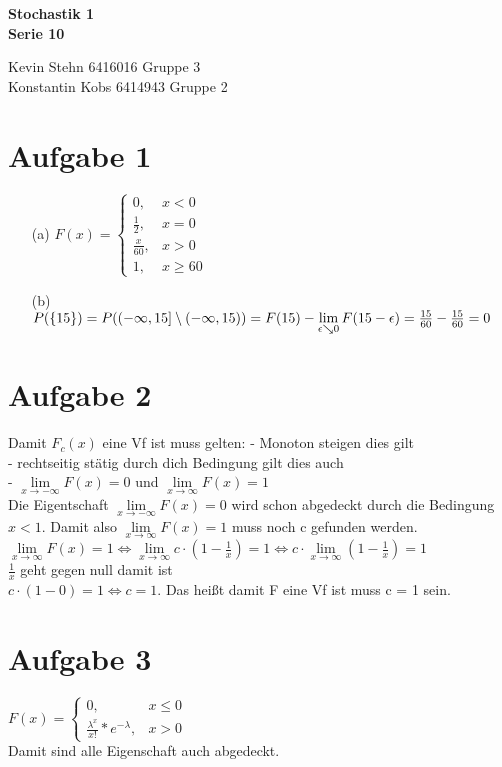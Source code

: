 \documentclass[10pt,a4paper]{article}
\begin{document}
\begin{center}
\textbf{Stochastik 1 \\ Serie 10 \\}
\end{center}

\begin{flushright}
Kevin Stehn 6416016 Gruppe 3 \\
Konstantin Kobs 6414943 Gruppe 2
\end{flushright}

\section*{Aufgabe 1}
\begin{itemize}
\item[(a)]
$ F(x)=\left\{\begin{array}{cl} 0, & x < 0\\ 
\frac{1}{2}, & x = 0 \\ 
\frac{x}{60}, & x > 0 \\
1 , & x \geq 60 \end{array}\right.$
\item[(b)]$P(\{15\}) = P((-\infty,15] \setminus (-\infty,15)) \\
= F(15) - \lim\limits_{\epsilon \searrow 0 }{F(15-\epsilon)}\\
= \frac{15}{60} - \frac{15}{60} = 0$
\end{itemize}

\section*{Aufgabe 2}
Damit $F_c(x)$ eine Vf ist muss gelten: - Monoton steigen dies gilt \\
- rechtseitig stätig durch dich Bedingung gilt dies auch\\
- $\lim\limits_{x \rightarrow -\infty }{F(x)} = 0$ und $\lim\limits_{x \rightarrow \infty }{F(x)} = 1$ \\
Die Eigentschaft $\lim\limits_{x \rightarrow -\infty }{F(x)} = 0$ wird schon abgedeckt durch die Bedingung $x < 1$. Damit also $\lim\limits_{x \rightarrow \infty }{F(x)} = 1$ muss noch c gefunden werden.\\
$\lim\limits_{x \rightarrow \infty }{F(x)} = 1 \Leftrightarrow \lim\limits_{x \rightarrow \infty }{c \cdot(1-\frac{1}{x})} = 1 \Leftrightarrow c \cdot \lim\limits_{x \rightarrow \infty }{ (1-\frac{1}{x})} = 1$ \\
$\frac{1}{x} $ geht gegen null damit ist\\
$c \cdot (1-0) = 1 \Leftrightarrow c = 1$.
Das heißt damit F eine Vf ist muss c = 1 sein.
\section*{Aufgabe 3}
$ F(x)=\left\{\begin{array}{cl} 0, & x \leq 0\\ 
\frac{\lambda^x}{x!}*e^{-\lambda}, & x > 0  \end{array}\right.$\\
Damit sind alle Eigenschaft auch abgedeckt.
\end{document}
